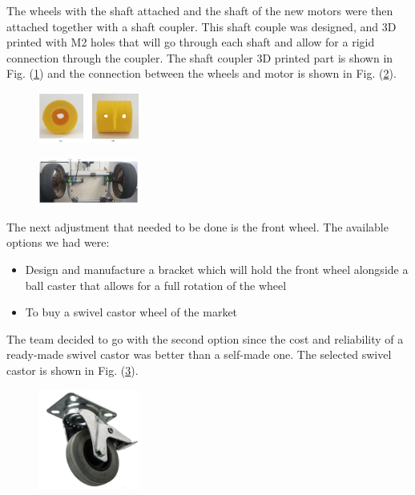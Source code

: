 \documentclass[11pt,landscape]{article}
\begin{document}
\begin{multicols}{3}
The wheels with the shaft attached and the shaft of the new motors were then
attached together with a shaft coupler. This shaft couple was designed, and 3D
printed with M2 holes that will go through each shaft and allow for a rigid
connection through the coupler. The shaft coupler 3D printed part is shown in
Fig. (\ref{fig:coupler}) and the connection between the wheels and motor is shown in
Fig. (\ref{fig:new_rear_wheels}).

\begin{figure}[H]
    \begin{center}
        \includegraphics[width=0.3\textwidth]{coupler.PNG}
        \label{fig:coupler}
    \end{center}
\end{figure}
\begin{figure}[H]
    \begin{center}
        \includegraphics[width=0.3\textwidth]{New rear wheels.PNG}
        \label{fig:new_rear_wheels}
    \end{center}
\end{figure}
The next adjustment that needed to be done is the front wheel. The available
options we had were:
\begin{itemize}
    \item Design and manufacture a bracket which will hold the front wheel alongside a ball caster that allows for a full rotation of the wheel
    \item To buy a swivel castor wheel of the market
\end{itemize}

The team decided to go with the second option since the cost and reliability of
a ready-made swivel castor was better than a self-made one. The selected swivel
castor is shown in Fig. (\ref{fig:castor}).

\begin{figure}[H]
    \begin{center}
        \includegraphics[width=0.3\textwidth]{Swivel castor.PNG}
        \label{fig:castor}
    \end{center}
\end{figure}


\end{multicols}
\end{document}
